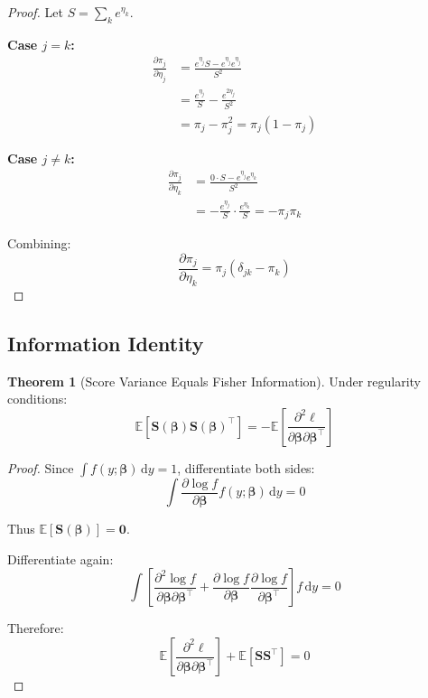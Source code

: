 \documentclass[11pt,letterpaper]{article}
\theoremstyle{definition}
\newtheorem{theorem}{Theorem}[section]
\newcommand{\E}{\mathbb{E}}
\newcommand{\bb}{\boldsymbol{\beta}}
\newcommand{\dd}{\,\mathrm{d}}
\begin{document}
\begin{proof}
Let $S = \sum_k e^{\eta_k}$.

\textbf{Case $j = k$:}
\begin{align}
    \frac{\partial \pi_j}{\partial \eta_j} &= \frac{e^{\eta_j} S - e^{\eta_j} e^{\eta_j}}{S^2} \\
    &= \frac{e^{\eta_j}}{S} - \frac{e^{2\eta_j}}{S^2} \\
    &= \pi_j - \pi_j^2 = \pi_j(1-\pi_j)
\end{align}

\textbf{Case $j \neq k$:}
\begin{align}
    \frac{\partial \pi_j}{\partial \eta_k} &= \frac{0 \cdot S - e^{\eta_j} e^{\eta_k}}{S^2} \\
    &= -\frac{e^{\eta_j}}{S} \cdot \frac{e^{\eta_k}}{S} = -\pi_j \pi_k
\end{align}

Combining:
\begin{equation}
    \frac{\partial \pi_j}{\partial \eta_k} = \pi_j(\delta_{jk} - \pi_k)
\end{equation}
\end{proof}

\subsection{Information Identity}

\begin{theorem}[Score Variance Equals Fisher Information]
Under regularity conditions:
\begin{equation}
    \E\left[\mathbf{S}(\bb)\mathbf{S}(\bb)^\top\right] = -\E\left[\frac{\partial^2 \ell}{\partial \bb \partial \bb^\top}\right]
\end{equation}
\end{theorem}

\begin{proof}
Since $\int f(y;\bb) \dd y = 1$, differentiate both sides:
\begin{equation}
    \int \frac{\partial \log f}{\partial \bb} f(y;\bb) \dd y = 0
\end{equation}

Thus $\E[\mathbf{S}(\bb)] = \mathbf{0}$.

Differentiate again:
\begin{equation}
    \int \left[\frac{\partial^2 \log f}{\partial \bb \partial \bb^\top} + \frac{\partial \log f}{\partial \bb}\frac{\partial \log f}{\partial \bb^\top}\right] f \dd y = 0
\end{equation}

Therefore:
\begin{equation}
    \E\left[\frac{\partial^2 \ell}{\partial \bb \partial \bb^\top}\right] + \E\left[\mathbf{S}\mathbf{S}^\top\right] = 0
\end{equation}
\end{proof}

\end{document}
